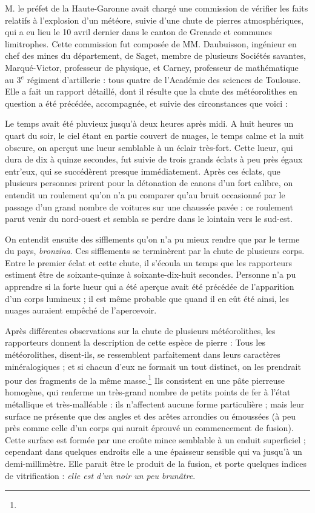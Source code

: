\documentclass[a4paper, 12pt, oneside, french]{article}
\begin{document}
\og M. le préfet de la Haute-Garonne avait chargé une commission de vérifier les faits relatifs à l'explosion d'un météore, suivie d'une chute de pierres atmosphériques, qui a eu lieu le 10 avril dernier dans le canton de Grenade et communes limitrophes. Cette commission fut composée de MM. Daubuisson, ingénieur en chef des mines du département, de Saget, membre de plusieurs Sociétés savantes, Marqué-Victor, professeur de physique, et Carney, professeur de mathématique au 3$^{e}$ régiment d'artillerie : tous quatre de l'Académie des sciences de Toulouse. Elle a fait un rapport détaillé, dont il résulte que la chute des météorolithes en question a été précédée, accompagnée, et suivie des circonstances que voici : \fg

\og Le temps avait été pluvieux jusqu'à deux heures après midi. A huit heures un quart du soir, le ciel étant en partie couvert de nuages, le temps calme et la nuit obscure, on aperçut une lueur semblable à un éclair très-fort. Cette lueur, qui dura de dix à quinze secondes, fut suivie de trois grands éclats à peu près égaux entr'eux, qui se succédèrent presque immédiatement. Après ces éclats, que plusieurs personnes prirent pour la détonation de canons d'un fort calibre, on entendit un roulement qu'on n'a pu comparer qu'au bruit occasionné par le passage d'un grand nombre de voitures sur une chaussée pavée : ce roulement parut venir du nord-ouest et sembla se perdre dans le lointain vers le sud-est. \fg

\og On entendit ensuite des sifflements qu'on n'a pu mieux rendre que par le terme du pays, \emph{bronzina}. Ces sifflements se terminèrent par la chute de plusieurs corps. Entre le premier éclat et cette chute, il s'écoula un temps que les rapporteurs estiment être de soixante-quinze à soixante-dix-huit secondes. Personne n'a pu apprendre si la forte lueur qui a été aperçue avait été précédée de l'apparition d'un corps lumineux ; il est même probable que quand il en eût été ainsi, les nuages auraient empêché de l'apercevoir. \fg

\og Après différentes observations sur la chute de plusieurs météorolithes, les rapporteurs donnent la description de cette espèce de pierre : Tous les météorolithes, disent-ils, se ressemblent parfaitement dans leurs caractères minéralogiques ; et si chacun d'eux ne formait un tout distinct, on les prendrait pour des fragments de la même masse.\footnote{} Ils consistent en une pâte pierreuse homogène, qui renferme un très-grand nombre de petits points de fer à l'état métallique et très-malléable : ils n'affectent aucune forme particulière ; mais leur surface ne présente que des angles et des arêtes arrondies ou émoussées (à peu près comme celle d'un corps qui aurait éprouvé un commencement de fusion). Cette surface est formée par une croûte mince semblable à un enduit superficiel ; cependant dans quelques endroits elle a une épaisseur sensible qui va jusqu'à un demi-millimètre. Elle parait être le produit de la fusion, et porte quelques indices de vitrification : \emph{elle est d'un noir un peu brunâtre}. \fg
\end{document}
